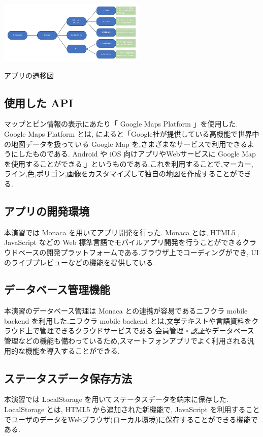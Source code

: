\documentclass[a4paper, twoside]{jarticle}
\makeatletter
\newenvironment{figurehere}
  {\def\@captype{figure}}
  {}
\makeatother
\begin{document}
\begin{multicols}{2}
\begin{figurehere}
\begin{center}
\includegraphics[bb=30 10 700 370,width=7cm]{./image13.png}
\end{center}
\caption{アプリの遷移図}\label{fig:12}
\end{figurehere}

\subsection{使用した API}
マップとピン情報の表示にあたり「 Google Maps Platform 」を使用した. Google Maps Platform とは, \cite{api}によると「Google社が提供している高機能で世界中の地図データを扱っている Google Map を,さまざまなサービスで利用できるようにしたものである. Android や iOS 向けアプリやWebサービスに Google Map を使用することができる.」というものである.これを利用することで,マーカー,ライン,色,ポリゴン,画像をカスタマイズして独自の地図を作成することができる.

\subsection{アプリの開発環境}
本演習では Monaca を用いてアプリ開発を行った. Monaca とは, HTML5 , JavaScript などの Web 標準言語でモバイルアプリ開発を行うことができるクラウドベースの開発プラットフォームである.ブラウザ上でコーディングができ, UI のライブプレビューなどの機能を提供している.

\subsection{データベース管理機能}
本演習のデータベース管理は Monaca との連携が容易であるニフクラ mobile backend を利用した.ニフクラ mobile backend とは,文学テキストや言語資料をクラウド上で管理できるクラウドサービスである.会員管理・認証やデータベース管理などの機能も備わっているため,スマートフォンアプリでよく利用される汎用的な機能を導入することができる.

\subsection{ステータスデータ保存方法}
本演習では LocalStorage を用いてステータスデータを端末に保存した. LocalStorage とは, HTML5 から追加された新機能で, JavaScript を利用することでユーザのデータをWebブラウザ(ローカル環境)に保存することができる機能である.


\end{multicols}
\end{document}

